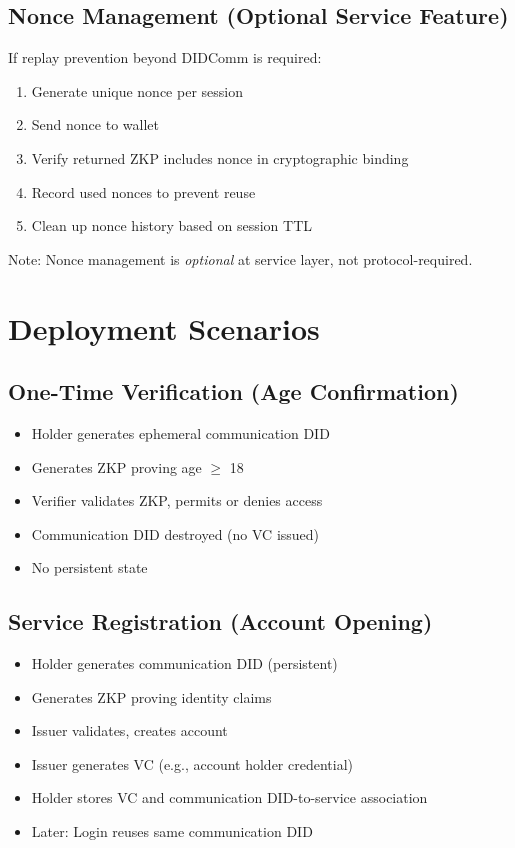 \subsection{Nonce Management (Optional Service Feature)}

If replay prevention beyond DIDComm is required:

\begin{enumerate}
  \item Generate unique nonce per session
  \item Send nonce to wallet
  \item Verify returned ZKP includes nonce in cryptographic binding
  \item Record used nonces to prevent reuse
  \item Clean up nonce history based on session TTL
\end{enumerate}

Note: Nonce management is \emph{optional} at service layer, not protocol-required.

\section{Deployment Scenarios}

\subsection{One-Time Verification (Age Confirmation)}

\begin{itemize}
  \item Holder generates ephemeral communication DID
  \item Generates ZKP proving age $\geq$ 18
  \item Verifier validates ZKP, permits or denies access
  \item Communication DID destroyed (no VC issued)
  \item No persistent state
\end{itemize}

\subsection{Service Registration (Account Opening)}

\begin{itemize}
  \item Holder generates communication DID (persistent)
  \item Generates ZKP proving identity claims
  \item Issuer validates, creates account
  \item Issuer generates VC (e.g., account holder credential)
  \item Holder stores VC and communication DID-to-service association
  \item Later: Login reuses same communication DID
\end{itemize}

